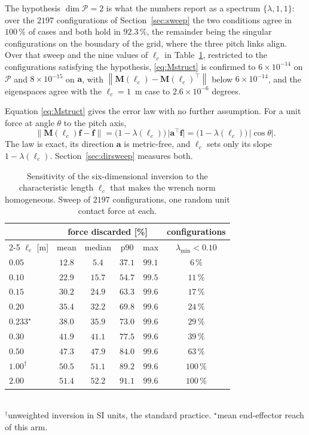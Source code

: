\documentclass{ieeeaccess}
\newcommand{\norm}[1]{\left\| #1 \right\|}
\newcommand{\lc}{\ell_c}
\newcommand{\Mlc}{\bm{M}(\lc)}
\begin{document}
The hypothesis $\dim\mathcal{P}=2$ is what the numbers report as a spectrum
$\{\lambda,1,1\}$: over the $2197$ configurations of Section~\ref{sec:sweep} the
two conditions agree in $100\,\%$ of cases and both hold in $92.3\,\%$, the
remainder being the singular configurations on the boundary of the grid, where the
three pitch links align. Over that sweep and the nine values of $\lc$ in
Table~\ref{tab:metric}, restricted to the configurations satisfying the hypothesis,
\eqref{eq:Mstruct} is confirmed to $6\times10^{-14}$ on $\mathcal{P}$ and
$8\times10^{-15}$ on $\bm a$, with $\norm{\Mlc-\Mlc^{\!\top}}$ below
$6\times10^{-14}$, and the eigenspaces agree with the $\lc=1$~m case to
$2.6\times10^{-6}$ degrees.

Equation \eqref{eq:Mstruct} gives the error law with no further assumption. For a
unit force at angle $\theta$ to the pitch axis,
\begin{equation}
\norm{\Mlc\bm f-\bm f}=\big(1-\lambda(\lc)\big)\,\big|\bm a^{\!\top}\bm f\big|
=\big(1-\lambda(\lc)\big)\,|\cos\theta| .
\label{eq:errlaw}
\end{equation}
The law is exact, its direction $\bm a$ is metric-free, and $\lc$ sets only its
slope $1-\lambda(\lc)$. Section~\ref{sec:dirsweep} measures both.

\begin{table}[!t]
\caption{Sensitivity of the six-dimensional inversion to the characteristic length
$\lc$ that makes the wrench norm homogeneous. Sweep of $2197$ configurations, one
random unit contact force at each.}
\label{tab:metric}
\centering
\footnotesize
\setlength{\tabcolsep}{4.5pt}
\begin{tabular}{lccccc}
\toprule
& \multicolumn{4}{c}{force discarded [\%]} & configurations\\
\cmidrule(lr){2-5}
$\lc$ [m] & mean & median & p90 & max & $\lambda_{\min}<0.10$\\
\midrule
$0.05$          & $12.8$ & $5.4$  & $37.1$ & $99.1$ & $6\,\%$\\
$0.10$          & $22.9$ & $15.7$ & $54.7$ & $99.5$ & $11\,\%$\\
$0.15$          & $30.2$ & $24.9$ & $63.3$ & $99.6$ & $17\,\%$\\
$0.20$          & $35.4$ & $32.2$ & $69.8$ & $99.6$ & $24\,\%$\\
$0.233^{\star}$ & $38.0$ & $35.9$ & $73.0$ & $99.6$ & $29\,\%$\\
$0.30$          & $41.9$ & $41.1$ & $77.5$ & $99.6$ & $39\,\%$\\
$0.50$          & $47.3$ & $47.9$ & $84.0$ & $99.6$ & $63\,\%$\\
$1.00^{\dagger}$& $50.5$ & $51.1$ & $89.2$ & $99.6$ & $100\,\%$\\
$2.00$          & $51.4$ & $52.2$ & $91.1$ & $99.6$ & $100\,\%$\\
\bottomrule
\end{tabular}
\\[2pt]
\footnotesize
$^{\dagger}$unweighted inversion in SI units, the standard practice.\quad
$^{\star}$mean end-effector reach of this arm.
\end{table}
\end{document}
